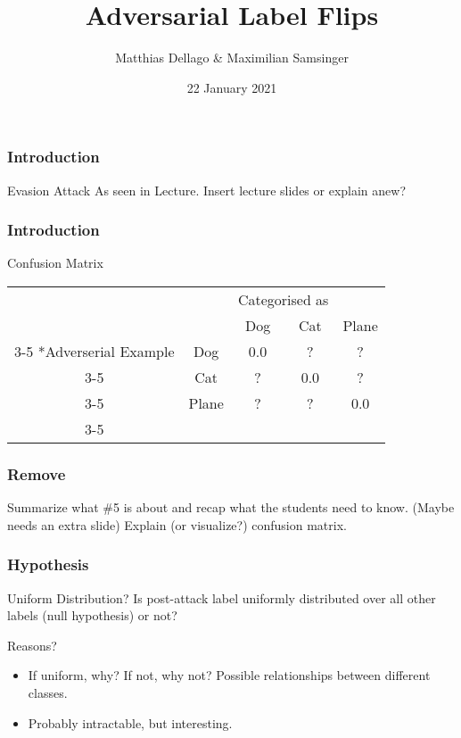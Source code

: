 \documentclass[10pt,usepdftitle=false,aspectratio=169]{beamer}
\title{Adversarial Label Flips}
\author{Matthias Dellago \& Maximilian Samsinger}
\date{22 January 2021}
\begin{document}
\DeclarePairedDelimiter\abs{\lvert}{\rvert}%
\DeclarePairedDelimiter\norm{\lVert}{\rVert}%
\DeclarePairedDelimiter\ceil{\lceil}{\rceil}
\DeclarePairedDelimiter\floor{\lfloor}{\rfloor}

\begin{frame}[plain]
	\maketitle
\end{frame}	

\begin{frame}[fragile]
	\frametitle{Introduction}
		\begin{block}{Evasion Attack}
			As seen in Lecture. Insert lecture slides or explain anew?
		\end{block}
\end{frame}

\begin{frame}[fragile]
	\frametitle{Introduction}
	\begin{block}{Confusion Matrix}
		  \begin{table}
			\setlength{\extrarowheight}{2pt}
			\begin{tabular}{cc|c|c|c|}
				& \multicolumn{1}{c}{} & \multicolumn{2}{c}{Categorised as}\\
				& \multicolumn{1}{c}{} & \multicolumn{1}{c}{Dog}  & \multicolumn{1}{c}{Cat} & \multicolumn{1}{c}{Plane} \\\cline{3-5}
				\multirow{3}*{Adverserial Example}  & Dog & 0.0 & ? & ?\\\cline{3-5}
				& Cat & ? & 0.0 &  ? \\\cline{3-5}
				& Plane & ? & ? &  0.0 \\\cline{3-5}
			\end{tabular}
		\end{table}
	\end{block}
\end{frame}

\begin{frame}[fragile]
	\frametitle{Remove}
	Summarize what \#5 is about and recap what the students need to know. (Maybe needs an extra slide)
	Explain (or visualize?) confusion matrix.
\end{frame}

\begin{frame}[fragile]
	\frametitle{Hypothesis}
			\begin{block}{Uniform Distribution?}
				Is post-attack label uniformly distributed over all other labels (null hypothesis) or not?
			\end{block}
			\begin{block}{Reasons?}	
				\begin{itemize}
					\item If uniform, why? If not, why not? Possible relationships between different classes.
					\item Probably intractable, but interesting.
				\end{itemize}
			\end{block}
\end{frame}
\end{document}
